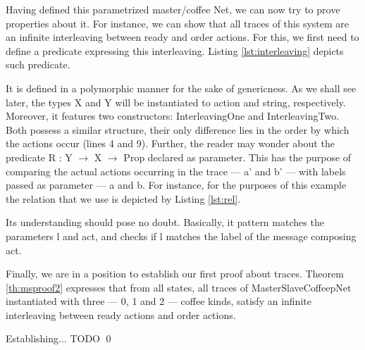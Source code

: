 	\noindent Having defined this parametrized master/coffee \textsf{Net}, we can
	now try to prove properties about it. For instance, we can show that all traces
	of this system are an infinite interleaving between \textsf{ready} and \textsf{order}
	\textsf{actions}. For this, we first need to define a predicate expressing
	this interleaving. Listing \ref{lst:interleaving} depicts such predicate.

					

	\noindent It is defined in a polymorphic manner for the sake of genericness.
	As we shall see later, the types \textsf{X} and \textsf{Y} will be instantiated to
	\textsf{action} and \textsf{string}, respectively.			
	Moreover, it features two constructors: \textsf{InterleavingOne} and \textsf{InterleavingTwo}.
	Both possess a similar structure, their only difference lies in the order
	by which the \textsf{actions} occur (lines 4 and 9). Further, the reader may wonder about
	the predicate \textsf{R : Y $\rightarrow$ X $\rightarrow$ Prop} declared as parameter.
	This has the purpose of comparing the actual \textsf{actions} occurring in the
	trace --- \textsf{a'} and \textsf{b'} --- with labels passed as parameter --- \textsf{a} and \textsf{b}. 
	For instance, for the purposes of this example the relation that we use is depicted by Listing \ref{lst:rel}.	
	
				

	\noindent Its understanding should pose no doubt. Basically, it pattern matches
	the parameters \textsf{l} and \textsf{act}, and checks if \textsf{l} matches 
	the label of the \textsf{message} composing \textsf{act}.
	
	Finally, we are in a position to establish our first proof about traces. Theorem
	\ref{th:msproof2} expresses that from all states, all traces of \textsf{MasterSlaveCoffeepNet} instantiated with three --- 0, 1 and 2 ---
	coffee kinds, satisfy an infinite interleaving between \textsf{ready} \textsf{actions} and \textsf{order}
	\textsf{actions}.
	

\begin{theorem} \label{th:msproof2} 
			
		Establishing... TODO \qed
\end{theorem}


